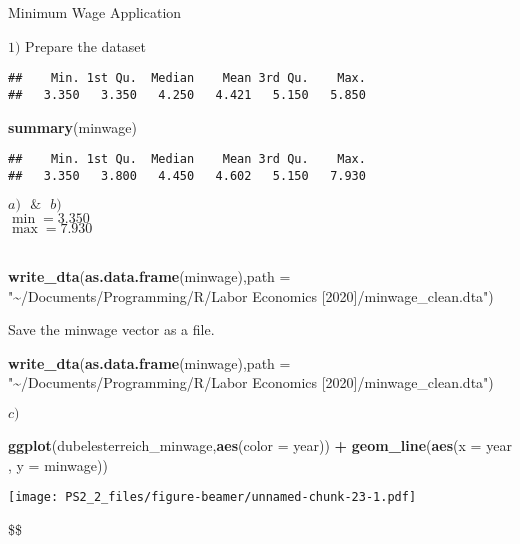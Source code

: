\documentclass[
  ignorenonframetext,
]{beamer}
\newenvironment{Shaded}{\begin{snugshade}}{\end{snugshade}}
\newcommand{\DataTypeTok}[1]{\textcolor[rgb]{0.13,0.29,0.53}{#1}}
\newcommand{\KeywordTok}[1]{\textcolor[rgb]{0.13,0.29,0.53}{\textbf{#1}}}
\newcommand{\NormalTok}[1]{#1}
\newcommand{\OperatorTok}[1]{\textcolor[rgb]{0.81,0.36,0.00}{\textbf{#1}}}
\newcommand{\StringTok}[1]{\textcolor[rgb]{0.31,0.60,0.02}{#1}}
\begin{document}
\begin{frame}[fragile]{Minimum Wage Application}
\begin{block}{\(1)\) Prepare the dataset}
\begin{verbatim}
##    Min. 1st Qu.  Median    Mean 3rd Qu.    Max. 
##   3.350   3.350   4.250   4.421   5.150   5.850
\end{verbatim}

\begin{Shaded}
\begin{Highlighting}[]
\KeywordTok{summary}\NormalTok{(minwage)}
\end{Highlighting}
\end{Shaded}

\begin{verbatim}
##    Min. 1st Qu.  Median    Mean 3rd Qu.    Max. 
##   3.350   3.800   4.450   4.602   5.150   7.930
\end{verbatim}

\hfill\break
\(a) \  \ \ \textrm{&} \ \ \ b)\)\\
\(\min = 3.350\)\\
\(\max = 7.930\)\\
~\\

\begin{Shaded}
\begin{Highlighting}[]
\KeywordTok{write\_dta}\NormalTok{(}\KeywordTok{as.data.frame}\NormalTok{(minwage),}\DataTypeTok{path =} \StringTok{"\textasciitilde{}/Documents/Programming/R/Labor Economics [2020]/minwage\_clean.dta"}\NormalTok{)}
\end{Highlighting}
\end{Shaded}

\hfill\break
\hfill\break
Save the minwage vector as a file.

\begin{Shaded}
\begin{Highlighting}[]
\KeywordTok{write\_dta}\NormalTok{(}\KeywordTok{as.data.frame}\NormalTok{(minwage),}\DataTypeTok{path =} \StringTok{"\textasciitilde{}/Documents/Programming/R/Labor Economics [2020]/minwage\_clean.dta"}\NormalTok{)}
\end{Highlighting}
\end{Shaded}

\hfill\break
\hfill\break
\(c)\)\\

\begin{Shaded}
\begin{Highlighting}[]
\KeywordTok{ggplot}\NormalTok{(dubelesterreich\_minwage,}\KeywordTok{aes}\NormalTok{(}\DataTypeTok{color =}\NormalTok{ year)) }\OperatorTok{+}
\StringTok{  }\KeywordTok{geom\_line}\NormalTok{(}\KeywordTok{aes}\NormalTok{(}\DataTypeTok{x =}\NormalTok{ year , }\DataTypeTok{y =}\NormalTok{ minwage))}
\end{Highlighting}
\end{Shaded}

\texttt{[image: PS2\_2\_files/figure-beamer/unnamed-chunk-23-1.pdf]}

\hfill\break
\hfill\break
\hfill\break
\$\$
\end{block}
\end{frame}
\end{document}
